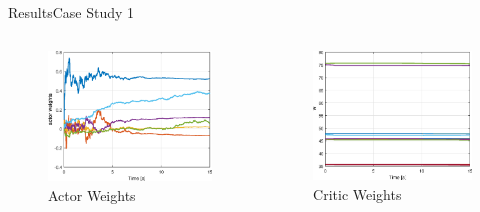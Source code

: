 \documentclass{beamer}
\begin{document}
\begin{frame}{Results}{Case Study 1}
\begin{columns}
\begin{column}{0.5\textwidth}
\begin{figure}
\includegraphics[scale=0.4]{figs/matlab/actorCritic/caseStudy1/weightActor.eps}
\caption{Actor Weights}
\end{figure}
\end{column}

\begin{column}{0.5\textwidth}
\begin{center}

\begin{figure}
\includegraphics[scale=0.4]{figs/matlab/actorCritic/caseStudy1/weightCritic.eps}
\caption{Critic Weights}
\end{figure}
\end{center}

\end{column}

\end{columns}

\end{frame}
\end{document}
